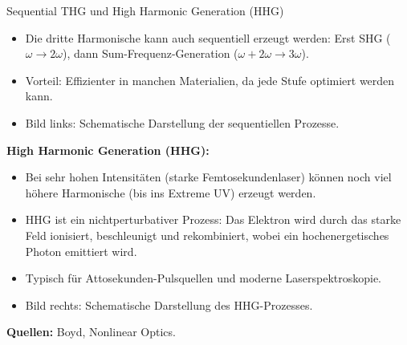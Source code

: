 \documentclass[notes=only]{beamer}
\begin{document}
\begin{frame}{Sequential THG und High Harmonic Generation (HHG)}
{\begin{itemize}
      \item Die dritte Harmonische kann auch sequentiell erzeugt werden: Erst SHG ($\omega \rightarrow 2\omega$), dann Sum-Frequenz-Generation ($\omega + 2\omega \rightarrow 3\omega$).
      \item Vorteil: Effizienter in manchen Materialien, da jede Stufe optimiert werden kann.
      \item Bild links: Schematische Darstellung der sequentiellen Prozesse.
    \end{itemize}
    \textbf{High Harmonic Generation (HHG):}
    \begin{itemize}
      \item Bei sehr hohen Intensitäten (starke Femtosekundenlaser) können noch viel höhere Harmonische (bis ins Extreme UV) erzeugt werden.
      \item HHG ist ein nichtperturbativer Prozess: Das Elektron wird durch das starke Feld ionisiert, beschleunigt und rekombiniert, wobei ein hochenergetisches Photon emittiert wird.
      \item Typisch für Attosekunden-Pulsquellen und moderne Laserspektroskopie.
      \item Bild rechts: Schematische Darstellung des HHG-Prozesses.
    \end{itemize}
    \textbf{Quellen:} Boyd, Nonlinear Optics.
  }
\end{frame}

\end{document}

